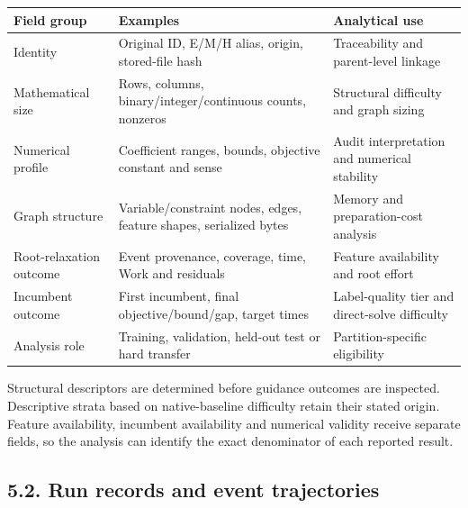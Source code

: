 \documentclass[
  british,
  10pt,
]{article}
\newcounter{none} %
\begin{document}
{\def\LTcaptype{none} %
\begin{longtable}[]{@{}
  >{\raggedright\arraybackslash}p{}
  >{\raggedright\arraybackslash}p{}
  >{\raggedright\arraybackslash}p{}@{}}
\toprule\noalign{}
\begin{minipage}[b]{\linewidth}\raggedright
Field group
\end{minipage} & \begin{minipage}[b]{\linewidth}\raggedright
Examples
\end{minipage} & \begin{minipage}[b]{\linewidth}\raggedright
Analytical use
\end{minipage} \\
\midrule\noalign{}
\endhead
\bottomrule\noalign{}
\endlastfoot
Identity & Original ID, E/M/H alias, origin, stored-file hash &
Traceability and parent-level linkage \\
Mathematical size & Rows, columns, binary/integer/continuous counts,
nonzeros & Structural difficulty and graph sizing \\
Numerical profile & Coefficient ranges, bounds, objective constant and
sense & Audit interpretation and numerical stability \\
Graph structure & Variable/constraint nodes, edges, feature shapes,
serialized bytes & Memory and preparation-cost analysis \\
Root-relaxation outcome & Event provenance, coverage, time, Work and
residuals & Feature availability and root effort \\
Incumbent outcome & First incumbent, final objective/bound/gap, target
times & Label-quality tier and direct-solve difficulty \\
Analysis role & Training, validation, held-out test or hard transfer &
Partition-specific eligibility \\
\end{longtable}
}

Structural descriptors are determined before guidance outcomes are
inspected. Descriptive strata based on native-baseline difficulty retain
their stated origin. Feature availability, incumbent availability and
numerical validity receive separate fields, so the analysis can identify
the exact denominator of each reported result.

\subsection{5.2. Run records and event
trajectories}\label{run-records-and-event-trajectories}
\end{document}
